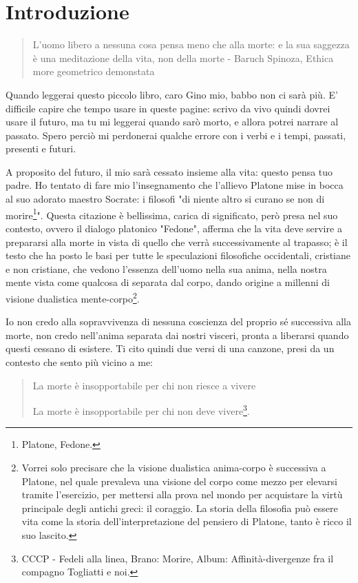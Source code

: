 \chapter*{Introduzione}

\begin{quotation}
	\small L'uomo libero a nessuna cosa pensa meno che alla morte: e la sua saggezza è una meditazione della vita, non della morte - Baruch Spinoza, Ethica more geometrico demonstata
\end{quotation}

Quando leggerai questo piccolo libro, caro Gino mio, babbo non ci sarà più. E' difficile capire che tempo usare in queste pagine: scrivo da vivo quindi dovrei usare il futuro, ma tu mi leggerai quando sarò morto, e allora potrei narrare al passato. Spero perciò mi perdonerai qualche errore con i verbi e i tempi, passati, presenti e futuri.

A proposito del futuro, il mio sarà cessato insieme alla vita: questo pensa tuo padre. Ho tentato di fare mio l'insegnamento che l'allievo Platone mise in bocca al suo adorato maestro Socrate: i filosofi "di niente altro si curano se non di morire\footnote{Platone, Fedone.}". Questa citazione è bellissima, carica di significato, però presa nel suo contesto, ovvero il dialogo platonico "Fedone", afferma che la vita deve servire a prepararsi alla morte in vista di quello che verrà successivamente al trapasso; è il testo che ha posto le basi per tutte le speculazioni filosofiche occidentali, cristiane e non cristiane, che vedono l'essenza dell'uomo nella sua anima, nella nostra mente vista come qualcosa di separata dal corpo, dando origine a millenni di visione dualistica mente-corpo\footnote{Vorrei solo precisare che la visione dualistica anima-corpo è successiva a Platone, nel quale prevaleva una visione del corpo come mezzo per elevarsi tramite l'esercizio, per mettersi alla prova nel mondo per acquistare la virtù principale degli antichi greci: il coraggio. La storia della filosofia può essere vita come la storia dell'interpretazione del pensiero di Platone, tanto è ricco il suo lascito.}. 

Io non credo alla sopravvivenza di nessuna coscienza del proprio sé successiva alla morte, non credo nell'anima separata dai nostri visceri, pronta a liberarsi quando questi cessano di esistere. Ti cito quindi due versi di una canzone, presi da un contesto che sento più vicino a me:

\begin{quotation}
	\small La morte è insopportabile per chi non riesce a vivere
	
	La morte è insopportabile per chi non deve vivere\footnote{CCCP - Fedeli alla linea, Brano: Morire, Album: Affinità-divergenze fra il compagno Togliatti e noi. }.
\end{quotation}

